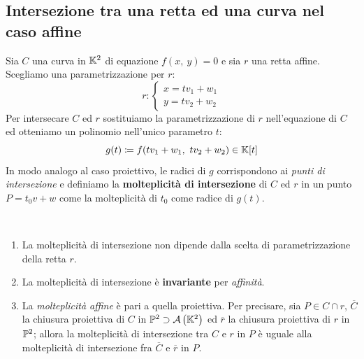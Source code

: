 \subsection{Intersezione tra una retta ed una curva nel caso affine}
Sia $C$ una curva in $\mathbb{K}^2$ di equazione $f\left(x,\ y\right)=0$ e sia $r$ una retta affine. Scegliamo una parametrizzazione per $r$:
\begin{equation}
	r\colon\begin{cases}
	x=tv_1+w_1\\
	y=tv_2+w_2
\end{cases}
\end{equation}
Per intersecare $C$ ed $r$ sostituiamo la parametrizzazione di $r$ nell'equazione di $C$ ed otteniamo un polinomio nell'unico parametro $t$:
\begin{equation}
	g(t)\coloneqq f(tv_1+w_1,\ tv_2+w_2)\in\kamp[t]
\end{equation}
In modo analogo al caso proiettivo, le radici di $g$ corrispondono ai \textit{punti di intersezione} e definiamo la \textbf{molteplicità di intersezione} di $C$ ed $r$ in un punto $P=t_0v+w$ come la molteplicità di $t_0$ come radice di $g(t)$.\\
\begin{observes}~{}
		\begin{enumerate}
		\item	La molteplicità di intersezione non dipende dalla scelta di parametrizzazione della retta $r$.
		\item	La molteplicità di intersezione è \textbf{invariante} per \textit{affinità}.
		\item	La \textit{molteplicità affine} è pari a quella proiettiva. Per precisare, sia $P\in C\cap r$, $\overline{C}$ la chiusura proiettiva di $C$ in $\proj[2]{\ }\supset\aff{\kamp^2}$ ed $\overline{r}$ la chiusura proiettiva di $r$ in $\proj[2]{\ }$; allora la molteplicità di intersezione tra $C$ e $r$ in $P$ è uguale alla molteplicità di intersezione fra $\overline{C}$ e $\overline{r}$ in $P$.
	\end{enumerate}
\vspace{-3mm}
\end{observes}

